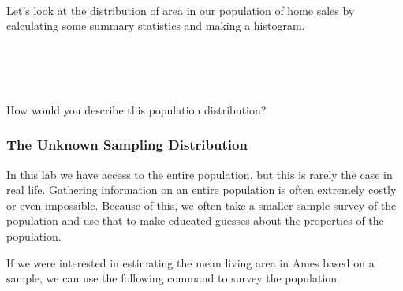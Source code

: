 \documentclass[11pt]{article}
\begin{document}
\ttfamily\noindent
\hlstd{}\hspace*{\fill}\\
\hlstd{}\hlassignement{\usebox{\hlnormalsizeboxlessthan}-}{\ }\hlkeyword{\usebox{\hlnormalsizeboxdollar}}\hspace*{\fill}\\
\hlstd{}\hlassignement{\usebox{\hlnormalsizeboxlessthan}-}{\ }\hlkeyword{\usebox{\hlnormalsizeboxdollar}}\hspace*{\fill}\\
\normalfont

Let's look at the distribution of area in our population of home sales by calculating some summary statistics and making a histogram.

\ttfamily\noindent
\hlstd{}\hspace*{\fill}\\
\hlstd{}\hlkeyword{(}\hlkeyword{)}\hspace*{\fill}\\
\hlstd{}\hlkeyword{(}\hlkeyword{)}\hspace*{\fill}\\
\normalfont

\begin{exercise}
How would you describe this population distribution?
\end{exercise}

\subsubsection*{The Unknown Sampling Distribution}
In this lab we have access to the entire population, but this is rarely the case in real life.  Gathering information on an entire population is often extremely costly or even impossible.  Because of this, we often take a smaller sample survey of the population and use that to make educated guesses about the properties of the population.

If we were interested in estimating the mean living area in Ames based on a sample, we can use the following command to survey the population.

\ttfamily\noindent
\hlstd{}\hspace*{\fill}\\
\hlstd{}\hlassignement{\usebox{\hlnormalsizeboxlessthan}-}{\ }\hlkeyword{(}\hlkeyword{,}{\ }\hlkeyword{)}\hspace*{\fill}\\
\normalfont
\end{document}
